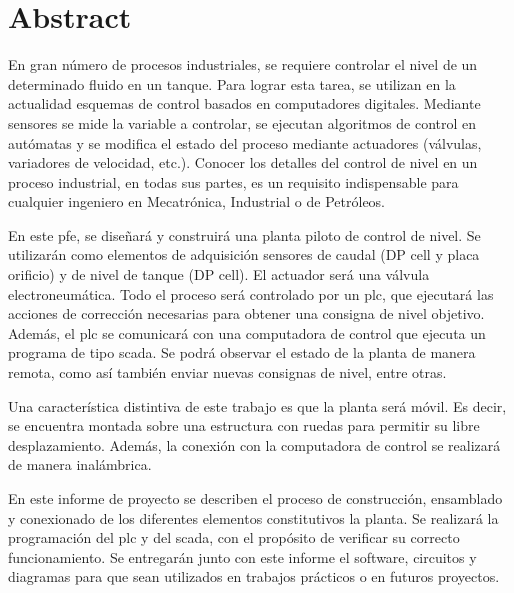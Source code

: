 \markboth{}{}
\pagestyle{empty}

\chapter*{Abstract}

En gran número de procesos industriales, se requiere controlar el
nivel de un determinado fluido en un tanque.
Para lograr esta tarea, se utilizan en la actualidad esquemas de control
basados en computadores digitales.
Mediante sensores se mide la variable a
controlar, se ejecutan algoritmos de control en autómatas y se
modifica el estado del proceso mediante actuadores (válvulas, variadores de
velocidad, etc.).
Conocer los detalles del control de nivel en un proceso industrial, en todas sus
partes, es un requisito
indispensable para cualquier ingeniero en Mecatrónica, Industrial o de
Petróleos.

En este \gls{pfe}, se diseñará y construirá una planta piloto de control de
nivel.
Se utilizarán como elementos de adquisición sensores de caudal (DP cell y placa
orificio) y de nivel de tanque (DP cell).
El actuador será una válvula electroneumática.
Todo el proceso será controlado por un \gls{plc},
que ejecutará las acciones de
corrección necesarias para obtener una consigna de nivel objetivo.
Además, el \gls{plc} se comunicará con una computadora de control que ejecuta
un programa de tipo \gls{scada}.
Se podrá observar el estado de la
planta de manera remota, como así también enviar nuevas consignas de nivel,
entre otras.

Una característica distintiva de este trabajo es que la planta será móvil.
Es decir, se encuentra montada sobre una estructura con ruedas para permitir su
libre desplazamiento.
Además, la conexión con la computadora de control se realizará de manera
inalámbrica.

En este informe de proyecto se describen el proceso de construcción,
ensamblado y conexionado de los diferentes elementos constitutivos la planta.
Se realizará la programación del \gls{plc} y del \gls{scada}, con el
propósito de verificar su correcto funcionamiento.
Se entregarán junto con este informe el software, circuitos y diagramas para
que sean utilizados en trabajos prácticos o en futuros proyectos.

